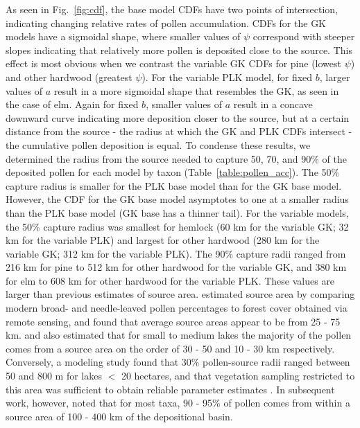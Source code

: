 \documentclass[12pt]{article}
\begin{document}
As seen in Fig.~\ref{fig:cdf}, the base model CDFs have two points of
intersection, indicating changing relative rates of pollen
accumulation. CDFs for the GK models have a sigmoidal shape, where
smaller values of $\psi$ correspond with steeper slopes indicating
that relatively more pollen is deposited close to the source. This
effect is most obvious when we contrast the variable GK CDFs for pine
(lowest $\psi$) and other hardwood (greatest $\psi$). For the variable
PLK model, for fixed $b$, larger values of $a$ result in a more
sigmoidal shape that resembles the GK, as seen in the case of
elm. Again for fixed $b$, smaller values of $a$ result in a concave
downward curve indicating more deposition closer to the source, but at
a certain distance from the source - the radius at which the GK and
PLK CDFs intersect - the cumulative pollen deposition is equal. To
condense these results, we determined the radius from the source
needed to capture 50, 70, and 90\% of the deposited pollen for each
model by taxon (Table~\ref{table:pollen_acc}). The 50\% capture radius
is smaller for the PLK base model than for the GK base model. However,
the CDF for the GK base model asymptotes to one at a smaller radius
than the PLK base model (GK base has a thinner tail). For the variable
models, the 50\% capture radius was smallest for hemlock (60 km for
the variable GK; 32 km for the variable PLK) and largest for other
hardwood (280 km for the variable GK; 312 km for the variable
PLK). The 90\% capture radii ranged from 216 km for pine to 512 km for
other hardwood for the variable GK, and 380 km for elm to 608 km for
other hardwood for the variable PLK. These values are larger than
previous estimates of source area. \citet{williams2003palynological}
estimated source area by comparing modern broad- and needle-leaved
pollen percentages to forest cover obtained via remote sensing, and
found that average source areas appear to be from 25 - 75
km. \citet{prentice1987quantitative} and
\citet{bradshaw1985relationships} also estimated that for small to
medium lakes the majority of the pollen comes from a source area on
the order of 30 - 50 and 10 - 30 km respectively. Conversely, a
modeling study found that 30\% pollen-source radii ranged between 50
and 800 m for lakes $<$ 20 hectares, and that vegetation sampling
restricted to this area was sufficient to obtain reliable parameter
estimates \citet{sugita1994pollen}. In subsequent work, however,
\citet{sugita2007theory2} noted that for most taxa, 90 - 95\% of
pollen comes from within a source area of 100 - 400 km of the
depositional basin.
\end{document}
